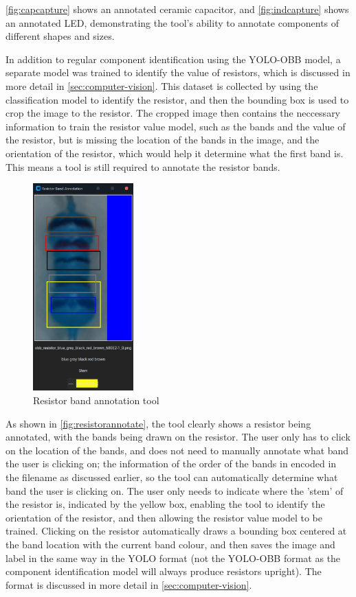 \autoref{fig:capcapture} shows an annotated ceramic capacitor, and \autoref{fig:indcapture} shows an annotated LED, demonstrating the tool's ability to annotate components of different shapes and sizes.

In addition to regular component identification using the YOLO-OBB model, a separate model was trained to identify the value of resistors, which is discussed in more detail in \autoref{sec:computer-vision}. This dataset is collected by using the classification model to identify the resistor, and then the bounding box is used to crop the image to the resistor. The cropped image then contains the neccessary information to train the resistor value model, such as the bands and the value of the resistor, but is missing the location of the bands in the image, and the orientation of the resistor, which would help it determine what the first band is. This means a tool is still required to annotate the resistor bands.

\begin{figure}[H]
    \hfill
    \begin{minipage}[t]{\textwidth}
      \centering
      \includegraphics[height=8cm]{imgs/python/resistorannotate.jpg}
        \caption{Resistor band annotation tool}
        \label{fig:resistorannotate}
    \end{minipage}
\end{figure}

As shown in \autoref{fig:resistorannotate}, the tool clearly shows a resistor being annotated, with the bands being drawn on the resistor. The user only has to click on the location of the bands, and does not need to manually annotate what band the user is clicking on; the information of the order of the bands in encoded in the filename as discussed earlier, so the tool can automatically determine what band the user is clicking on. The user only needs to indicate where the 'stem' of the resistor is, indicated by the yellow box, enabling the tool to identify the orientation of the resistor, and then allowing the resistor value model to be trained. Clicking on the resistor automatically draws a bounding box centered at the band location with the current band colour, and then saves the image and label in the same way in the YOLO format (not the YOLO-OBB format as the component identification model will always produce resistors upright). The format is discussed in more detail in \autoref{sec:computer-vision}. 

